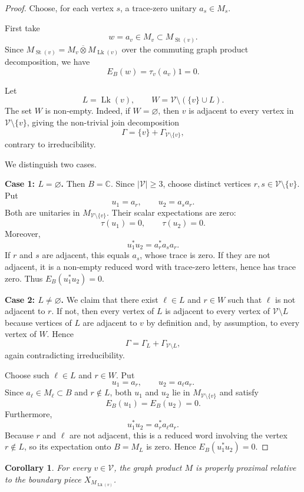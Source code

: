 \documentclass[12pt]{article}
\newtheorem{corollary}[theorem]{Corollary}
\theoremstyle{definition}
\newcommand{\V}{\mathcal V}
\newcommand{\Lk}{\operatorname{Lk}}
\newcommand{\St}{\operatorname{St}}
\newcommand{\C}{\mathbb C}
\newcommand{\bbarotimes}{\mathbin{\overline\otimes}}
\begin{document}
\begin{proof}
Choose, for each vertex $s$, a trace-zero unitary $a_s\in M_s$.

First take
\[
w=a_v\in M_v\subset M_{\St(v)}.
\]
Since $M_{\St(v)}=M_v\bbarotimes M_{\Lk(v)}$ over the commuting graph product decomposition, we have
\[
E_B(w)=\tau_v(a_v)1=0.
\]

Let
\[
L=\Lk(v),\qquad W=\V\setminus(\{v\}\cup L).
\]
The set $W$ is non-empty.  Indeed, if $W=\varnothing$, then $v$ is adjacent to every vertex in $\V\setminus\{v\}$, giving the non-trivial join decomposition
\[
\Gamma=\{v\}+\Gamma_{\V\setminus\{v\}},
\]
contrary to irreducibility.

We distinguish two cases.

\smallskip

\noindent\textbf{Case 1: $L=\varnothing$.}
Then $B=\C$.  Since $|\V|\geq 3$, choose distinct vertices $r,s\in \V\setminus\{v\}$.  Put
\[
u_1=a_r,\qquad u_2=a_s a_r.
\]
Both are unitaries in $M_{\V\setminus\{v\}}$.  Their scalar expectations are zero:
\[
\tau(u_1)=0,\qquad \tau(u_2)=0.
\]
Moreover,
\[
u_1^*u_2=a_r^*a_s a_r.
\]
If $r$ and $s$ are adjacent, this equals $a_s$, whose trace is zero.  If they are not adjacent, it is a non-empty reduced word with trace-zero letters, hence has trace zero.  Thus $E_B(u_1^*u_2)=0$.

\smallskip

\noindent\textbf{Case 2: $L\neq \varnothing$.}
We claim that there exist $\ell\in L$ and $r\in W$ such that $\ell$ is not adjacent to $r$.  If not, then every vertex of $L$ is adjacent to every vertex of $\V\setminus L$ because vertices of $L$ are adjacent to $v$ by definition and, by assumption, to every vertex of $W$.  Hence
\[
\Gamma=\Gamma_L+\Gamma_{\V\setminus L},
\]
again contradicting irreducibility.

Choose such $\ell\in L$ and $r\in W$.  Put
\[
u_1=a_r,\qquad u_2=a_\ell a_r.
\]
Since $a_\ell\in M_\ell\subset B$ and $r\notin L$, both $u_1$ and $u_2$ lie in $M_{\V\setminus\{v\}}$ and satisfy
\[
E_B(u_1)=E_B(u_2)=0.
\]
Furthermore,
\[
u_1^*u_2=a_r^*a_\ell a_r.
\]
Because $r$ and $\ell$ are not adjacent, this is a reduced word involving the vertex $r\notin L$, so its expectation onto $B=M_L$ is zero.  Hence $E_B(u_1^*u_2)=0$.
\end{proof}

\begin{corollary}\label{cor:relative}
For every $v\in\V$, the graph product $M$ is properly proximal relative to the boundary piece $X_{M_{\Lk(v)}}$.
\end{corollary}
\end{document}
